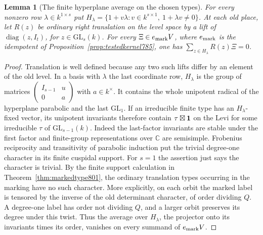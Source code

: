 \documentclass[a4paper,11pt]{article}
\newtheorem{lemma}[proposition]{Lemma}
\theoremstyle{definition}
\theoremstyle{remark}
\numberwithin{equation}{section}
\begin{document}
\begin{lemma}[The finite hyperplane average on the chosen types]
\leavevmode\label{lem:finitehyperplane847}
For every nonzero row \(\lambda\in k^{1\times s}\) put
\(H_\lambda=\{1+v\lambda:v\in k^{s\times1},\
1+\lambda v\ne0\}\). At each old place, let \(R(z)\) be
ordinary right translation on the level space by a lift of
\(\operatorname{diag}(z,I_t)\), for \(z\in\mathrm{GL}_s(k)\).
For every \(\Xi\in e_{\rm mark}V\), where \(e_{\rm mark}\)
is the idempotent of Proposition~\ref{prop:testedkernel785},
one has \(\sum_{z\in H_\lambda}R(z)\Xi=0\).
\end{lemma}
\begin{proof}
Translation is well defined because any two such lifts differ
by an element of the old level. In a basis with \(\lambda\) the
last coordinate row, \(H_\lambda\) is the group of matrices
\(\left(\begin{smallmatrix}I_{s-1}&u\\0&a\end{smallmatrix}\right)\)
with \(a\in k^\times\). It contains the whole unipotent radical
of the hyperplane parabolic and the last \(\mathrm{GL}_1\).
If an irreducible finite type has an \(H_\lambda\)-fixed
vector, its unipotent invariants therefore contain
\(\tau\boxtimes{\bf1}\) on the Levi for some irreducible
\(\tau\) of \(\mathrm{GL}_{s-1}(k)\). Indeed the last-factor
invariants are stable under the first factor and finite-group
representations over \(\mathbb C\) are semisimple.
Frobenius reciprocity and transitivity of parabolic induction
put the trivial degree-one character in its finite cuspidal
support. For \(s=1\) the assertion just says the character is
trivial. By the finite support calculation in
Theorem~\ref{thm:markedtype801}, the ordinary translation types
occurring in the marking have no such character. More explicitly,
on each orbit the marked label is tensored by the inverse of
the old determinant character, of order dividing \(Q\).
A degree-one label has order not dividing \(Q\), and a larger
orbit preserves its degree under this twist. Thus the average
over \(H_\lambda\), the projector onto its invariants times
its order, vanishes on every summand of \(e_{\rm mark}V\).
\end{proof}
\end{document}

